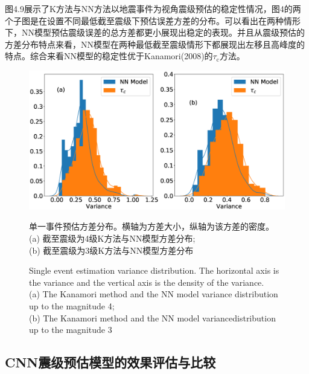 \indent 图4.9展示了K方法与NN方法以地震事件为视角震级预估的稳定性情况，图4的两个子图是在设置不同最低截至震级下预估误差方差的分布。可以看出在两种情形下，NN模型预估震级误差的总方差都更小展现出稳定的表现。并且从震级预估的方差分布特点来看，NN模型在两种最低截至震级情形下都展现出左移且高峰度的特点。综合来看NN模型的稳定性优于Kanamori(2008)的$\tau_{\mathrm{c}}$方法。\\
\begin{figure}[!h] 
\centering 
 \includegraphics[width=\linewidth]{img/9.eps} 
 \renewcommand{\figurename}{图} 
\caption{单一事件预估方差分布。横轴为方差大小，纵轴为该方差的密度。\\
(a) 截至震级为4级K方法与NN模型方差分布;\\
(b) 截至震级为3级K方法与NN模型方差分布\\
} 
\addtocounter{figure}{-1} \vspace{-5pt} 
\renewcommand{\figurename}{Fig} 
\caption{Single event estimation variance distribution. The horizontal axis is the variance and the vertical axis is the density of the variance.\\
(a) The Kanamori method and the NN model variance distribution up to the
magnitude 4; \\
(b) The Kanamori method and the NN model variancedistribution up to the magnitude 3} 
\renewcommand{\figurename}{图} 
\label{fig:network-device-influence.png} 
\end{figure}
\subsection{CNN震级预估模型的效果评估与比较}
